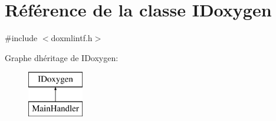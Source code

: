 \hypertarget{class_i_doxygen}{}\section{Référence de la classe I\+Doxygen}
\label{class_i_doxygen}


{\ttfamily \#include $<$doxmlintf.\+h$>$}

Graphe d\textquotesingle{}héritage de I\+Doxygen\+:\begin{figure}[H]
\begin{center}
\leavevmode
\includegraphics[height=2.000000cm]{class_i_doxygen}
\end{center}
\end{figure}
